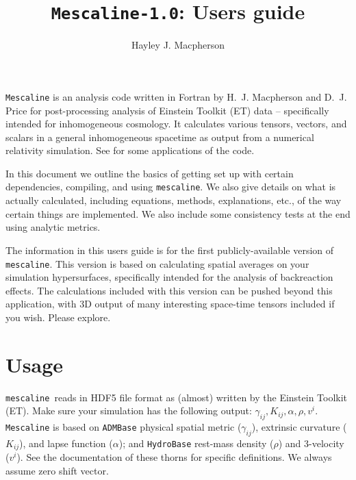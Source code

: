 \documentclass[a4paper]{article}
\title{\texttt{Mescaline-1.0}: Users guide}
\author{Hayley J. Macpherson}
\newcommand{\mesc}{\texttt{mescaline}}
\begin{document}
\maketitle


\texttt{Mescaline} is an analysis code written in Fortran by H.~J. Macpherson and D.~J. Price for post-processing analysis of Einstein Toolkit (ET) data -- specifically intended for inhomogeneous cosmology. It calculates various tensors, vectors, and scalars in a general inhomogeneous spacetime as output from a numerical relativity simulation. 
See \citet{macpherson2018b,macpherson2019a} for some applications of the code. 

In this document we outline the basics of getting set up with certain dependencies, compiling, and using \mesc. We also give details on what is actually calculated, including equations, methods, explanations, etc., of the way certain things are implemented. We also include some consistency tests at the end using analytic metrics.

The information in this users guide is for the first publicly-available version of \mesc. This version is based on calculating spatial averages on your simulation hypersurfaces, specifically intended for the analysis of backreaction effects. The calculations included with this version can be pushed beyond this application, with 3D output of many interesting space-time tensors included if you wish. Please explore. 



\tableofcontents


\section{Usage}

\mesc\, reads in HDF5 file format as (almost) written by the Einstein Toolkit (ET). Make sure your simulation has the following output: $\gamma_{ij}, K_{ij}, \alpha, \rho, v^i$. \texttt{Mescaline} is based on \texttt{ADMBase} physical spatial metric ($\gamma_{ij}$), extrinsic curvature ($K_{ij}$), and lapse function ($\alpha$); and \texttt{HydroBase} rest-mass density ($\rho$) and 3-velocity ($v^i$). See the documentation of these thorns for specific definitions. We always assume zero shift vector. 
\end{document}
